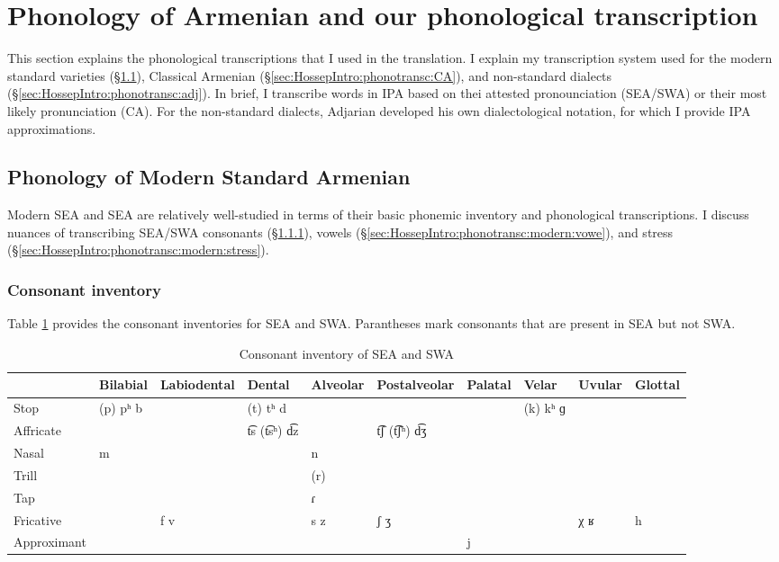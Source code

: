  \section{Phonology of Armenian and our phonological transcription}\label{sec:HossepIntro:phonotransc}

This section explains the phonological transcriptions that I used in the translation. I explain my transcription system used for the modern standard varieties (\S\ref{sec:HossepIntro:phonotransc:modern}), Classical Armenian (\S\ref{sec:HossepIntro:phonotransc:CA}),  and non-standard dialects (\S\ref{sec:HossepIntro:phonotransc:adj}). In brief, I transcribe words in IPA based on thei attested pronounciation (SEA/SWA)  or their most likely pronunciation (CA). For the non-standard dialects, Adjarian developed his own dialectological notation, for which I provide IPA approximations. 
\subsection{Phonology of Modern Standard Armenian}\label{sec:HossepIntro:phonotransc:modern}

Modern SEA and SEA are relatively well-studied in terms of their basic phonemic inventory and phonological transcriptions. I discuss nuances of transcribing SEA/SWA consonants (\S\ref{sec:HossepIntro:phonotransc:modern:cons}), vowels (\S\ref{sec:HossepIntro:phonotransc:modern:vowe}),  and stress (\S\ref{sec:HossepIntro:phonotransc:modern:stress}). 
\subsubsection{Consonant inventory}\label{sec:HossepIntro:phonotransc:modern:cons}
Table \ref{fig:HossepIntro:consSEA} provides the consonant inventories for SEA and SWA. Parantheses mark consonants that are present in SEA but not SWA. 

\begin{table}[H]
	\caption{Consonant inventory of SEA and SWA}\label{fig:HossepIntro:consSEA}
	\begin{tabular}{| l| lllllllll| }
			\hline 	& Bilabial & Labiodental & Dental & Alveolar & Postalveolar & Palatal & Velar & Uvular & Glottal \\
			\hline 	Stop & (p) pʰ b & & (t) tʰ d & & & & (k) kʰ ɡ & & \\
		Affricate & & & t͡s (t͡sʰ) d͡z & & t͡ʃ (t͡ʃʰ) d͡ʒ & & & & \\
		Nasal & m & & & n & & & & & \\
		Trill & & & & (r) & & & & & \\
		Tap & & & & ɾ & & & & & \\
		Fricative & & f v & & s z & ʃ ʒ & & & χ ʁ & h \\
		Approximant & & & & & & j & & & \\
		\hline 
	\end{tabular}
\end{table}

